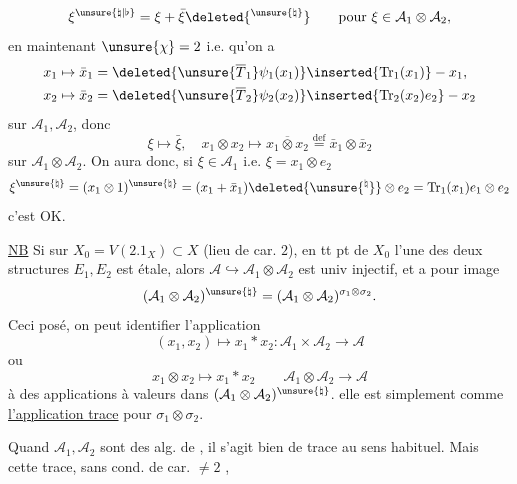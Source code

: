 \[
\xi^{\unsure{\natural|\flat}}=\xi+\bar\xi\deleted{^{\unsure{\natural}}}
\qquad\text{pour }\xi\in\mathcal A_1\otimes\mathcal A_2,
\]
en  maintenant $\unsure{\chi}=2$ i.e. qu'on a
\[
\begin{aligned}
x_1&\mapsto\bar x_1=\deleted{\unsure{\overline T_1}\psi_1(x_1)}\inserted{\operatorname{Tr}_1(x_1)}-x_1,\\
x_2&\mapsto\bar x_2=\deleted{\unsure{\overline T_2}\psi_2(x_2)}\inserted{\operatorname{Tr}_2(x_2)e_2}-x_2
\end{aligned}
\]
sur $\mathcal A_1,\mathcal A_2$, donc
\[
\xi\mapsto\bar\xi,\quad x_1\otimes x_2\mapsto\overline{x_1\otimes x_2}\overset{\mathrm{def}}=\bar x_1\otimes\bar x_2
\]
sur $\mathcal A_1\otimes\mathcal A_2$. On aura donc, si $\xi\in\mathcal A_1$ i.e. $\xi=x_1\otimes e_2$
\[
\xi^{\unsure{\natural}}=(x_1\otimes1)^{\unsure{\natural}}=(x_1+\bar x_1)\deleted{\unsure{^{\natural}}}\otimes e_2=\operatorname{Tr}_1(x_1)e_1\otimes e_2
\]
c'est OK.

\uline{NB} Si  sur $X_0=V(2.1_X)\subset X$ (lieu de car. $2$), en tt pt de $X_0$ l'une des deux structures $E_1,E_2$ est étale, alors $\mathcal A\hookrightarrow\mathcal A_1\otimes\mathcal A_2$ est univ injectif, et a pour image
\[
(\mathcal A_1\otimes\mathcal A_2)^{\unsure{\natural}}=(\mathcal A_1\otimes\mathcal A_2)^{\sigma_1\otimes\sigma_2}.
\]
Ceci posé, on peut  identifier l'application
\[
(x_1,x_2)\mapsto x_1*x_2:\mathcal A_1\times\mathcal A_2\longrightarrow\mathcal A
\]
ou
\[
x_1\otimes x_2\mapsto x_1*x_2\qquad \mathcal A_1\otimes\mathcal A_2\longrightarrow\mathcal A
\]
à des applications à valeurs dans $(\mathcal A_1\otimes\mathcal A_2)^{\unsure{\natural}}$.
 elle est simplement  comme \uline{l'application trace} pour $\sigma_1\otimes\sigma_2$.

Quand $\mathcal A_1,\mathcal A_2$ sont des alg. de , il s'agit bien de trace au sens habituel.
Mais cette trace, sans cond. de car. $\ne2$ ,
